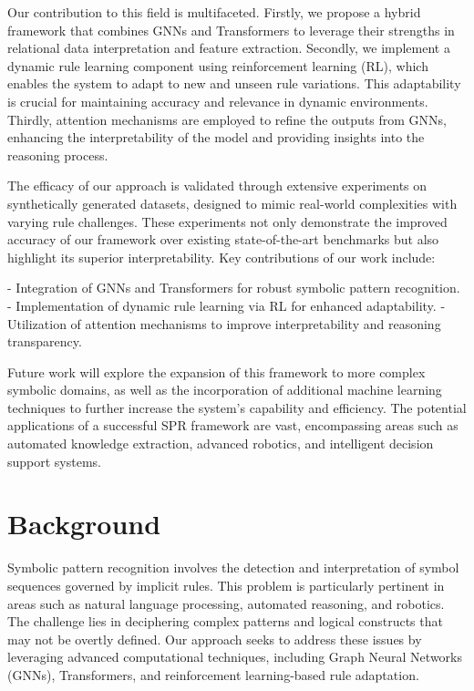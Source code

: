 \documentclass{article}
\begin{document}
Our contribution to this field is multifaceted. Firstly, we propose a hybrid framework that combines GNNs and Transformers to leverage their strengths in relational data interpretation and feature extraction. Secondly, we implement a dynamic rule learning component using reinforcement learning (RL), which enables the system to adapt to new and unseen rule variations. This adaptability is crucial for maintaining accuracy and relevance in dynamic environments. Thirdly, attention mechanisms are employed to refine the outputs from GNNs, enhancing the interpretability of the model and providing insights into the reasoning process.

The efficacy of our approach is validated through extensive experiments on synthetically generated datasets, designed to mimic real-world complexities with varying rule challenges. These experiments not only demonstrate the improved accuracy of our framework over existing state-of-the-art benchmarks but also highlight its superior interpretability. Key contributions of our work include:

- Integration of GNNs and Transformers for robust symbolic pattern recognition.
- Implementation of dynamic rule learning via RL for enhanced adaptability.
- Utilization of attention mechanisms to improve interpretability and reasoning transparency.

Future work will explore the expansion of this framework to more complex symbolic domains, as well as the incorporation of additional machine learning techniques to further increase the system's capability and efficiency. The potential applications of a successful SPR framework are vast, encompassing areas such as automated knowledge extraction, advanced robotics, and intelligent decision support systems.

\section{Background}
Symbolic pattern recognition involves the detection and interpretation of symbol sequences governed by implicit rules. This problem is particularly pertinent in areas such as natural language processing, automated reasoning, and robotics. The challenge lies in deciphering complex patterns and logical constructs that may not be overtly defined. Our approach seeks to address these issues by leveraging advanced computational techniques, including Graph Neural Networks (GNNs), Transformers, and reinforcement learning-based rule adaptation.
\end{document}
